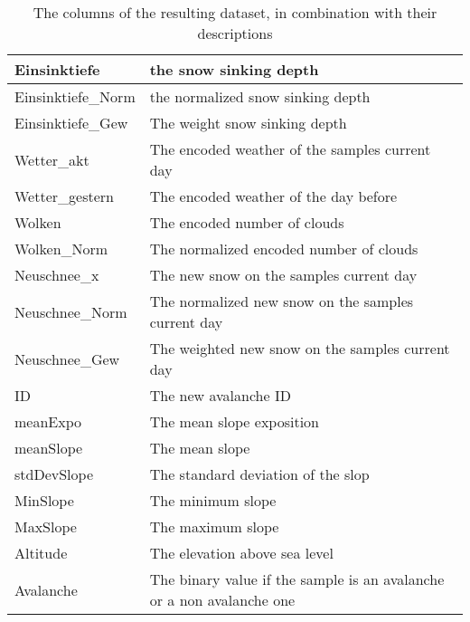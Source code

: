 \documentclass[../masterarbeit.tex]{subfiles}
\begin{document}
\begin{table}
\begin{tabular}{|l|l|}
        Einsinktiefe & the snow sinking depth \\ \hline
        Einsinktiefe\_Norm & the normalized snow sinking depth \\ \hline
        Einsinktiefe\_Gew & The weight snow sinking depth \\ \hline
        Wetter\_akt & The encoded weather of the samples current day \\ \hline
        Wetter\_gestern & The encoded weather of the day before \\ \hline
        Wolken & The encoded number of clouds \\ \hline
        Wolken\_Norm & The normalized encoded number of clouds \\ \hline
        Neuschnee\_x & The new snow on the samples current day \\ \hline
        Neuschnee\_Norm & The normalized new snow on the samples current day \\ \hline
        Neuschnee\_Gew & The weighted new snow on the samples current day \\ \hline
        ID & The new avalanche ID \\ \hline
        meanExpo & The mean slope exposition \\ \hline
        meanSlope & The mean slope \\ \hline
        stdDevSlope & The standard deviation of the slop \\ \hline
        MinSlope & The minimum slope \\ \hline
        MaxSlope & The maximum slope \\ \hline
        Altitude & The elevation above sea level \\ \hline
        Avalanche & The binary value if the sample is an avalanche or a non avalanche one \\ \hline
    \end{tabular}
    \caption{The columns of the resulting dataset, in combination with their descriptions}
\end{table}
\end{document}
